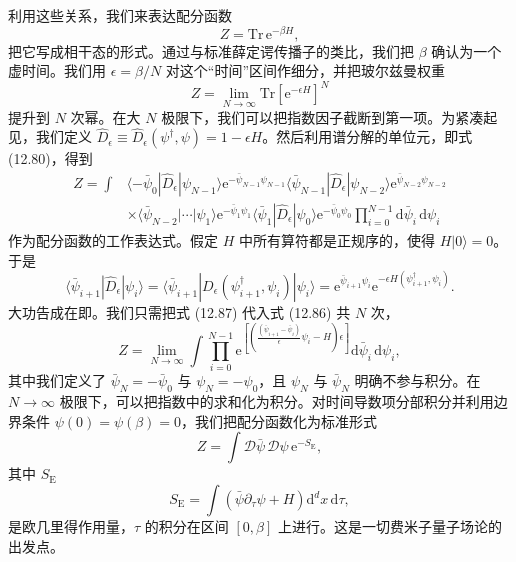 利用这些关系，我们来表达配分函数
\begin{equation*}
Z=\mathrm{Tr}\,\mathrm e^{-\beta H}, \tag{12.84}
\end{equation*}
把它写成相干态的形式。通过与标准薛定谔传播子的类比，我们把 $\beta$ 确认为一个虚时间。我们用 $\epsilon=\beta/N$ 对这个“时间”区间作细分，并把玻尔兹曼权重
\begin{equation*}
Z=\lim_{N\to\infty}\mathrm{Tr}\left[\mathrm e^{-\epsilon H}\right]^N \tag{12.85}
\end{equation*}
提升到 $N$ 次幂。在大 $N$ 极限下，我们可以把指数因子截断到第一项。为紧凑起见，我们定义 $\hat D_\epsilon\equiv\hat D_\epsilon(\psi^\dagger,\psi)=1-\epsilon H$。然后利用谱分解的单位元，即式 (12.80)，得到
\begin{align*}
Z=\int{}&\langle-\bar\psi_0|\hat D_\epsilon|\psi_{N-1}\rangle\mathrm e^{-\bar\psi_{N-1}\psi_{N-1}}\langle\bar\psi_{N-1}|\hat D_\epsilon|\psi_{N-2}\rangle\mathrm e^{\bar\psi_{N-2}\psi_{N-2}}\\
&\times\langle\bar\psi_{N-2}|\cdots|\psi_1\rangle\mathrm e^{-\bar\psi_1\psi_1}\langle\bar\psi_1|\hat D_\epsilon|\psi_0\rangle\mathrm e^{-\bar\psi_0\psi_0}\prod_{i=0}^{N-1}\mathrm d\bar\psi_i\,\mathrm d\psi_i \tag{12.86}
\end{align*}
作为配分函数的工作表达式。假定 $H$ 中所有算符都是正规序的，使得 $H|0\rangle=0$。于是
\begin{equation*}
\langle\bar\psi_{i+1}|\hat D_\epsilon|\psi_i\rangle=\langle\bar\psi_{i+1}|D_\epsilon(\psi^\dagger_{i+1},\psi_i)|\psi_i\rangle=\mathrm e^{\bar\psi_{i+1}\psi_i}\mathrm e^{-\epsilon H(\psi^\dagger_{i+1},\psi_i)}. \tag{12.87}
\end{equation*}
大功告成在即。我们只需把式 (12.87) 代入式 (12.86) 共 $N$ 次，
\begin{equation*}
Z=\lim_{N\to\infty}\int\prod_{i=0}^{N-1}\mathrm e^{\left[\left(\frac{(\bar\psi_{i+1}-\bar\psi_i)}{\epsilon}\psi_i-H\right)\epsilon\right]}\mathrm d\bar\psi_i\,\mathrm d\psi_i, \tag{12.88}
\end{equation*}
其中我们定义了 $\bar\psi_N=-\bar\psi_0$ 与 $\psi_N=-\psi_0$，且 $\psi_N$ 与 $\bar\psi_N$ 明确不参与积分。在 $N\to\infty$ 极限下，可以把指数中的求和化为积分。对时间导数项分部积分并利用边界条件 $\psi(0)=\psi(\beta)=0$，我们把配分函数化为标准形式
\begin{equation*}
Z=\int\mathcal D\bar\psi\,\mathcal D\psi\,\mathrm e^{-S_{\mathrm E}}, \tag{12.89}
\end{equation*}
其中 $S_{\mathrm E}$
\begin{equation*}
S_{\mathrm E}=\int\left(\bar\psi\partial_\tau\psi+H\right)\mathrm d^d x\,\mathrm d\tau, \tag{12.90}
\end{equation*}
是欧几里得作用量，$\tau$ 的积分在区间 $[0,\beta]$ 上进行。这是一切费米子量子场论的出发点。

